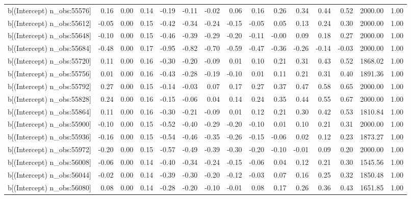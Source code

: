 \begin{table}[ht]
\begin{tabular}{rrrrrrrrrrrrrrr}
  b[(Intercept) n\_obs:55576] & 0.16 & 0.00 & 0.14 & -0.19 & -0.11 & -0.02 & 0.06 & 0.16 & 0.26 & 0.34 & 0.44 & 0.52 & 2000.00 & 1.00 \\ 
  b[(Intercept) n\_obs:55612] & -0.05 & 0.00 & 0.15 & -0.42 & -0.34 & -0.24 & -0.15 & -0.05 & 0.05 & 0.13 & 0.24 & 0.30 & 2000.00 & 1.00 \\ 
  b[(Intercept) n\_obs:55648] & -0.10 & 0.00 & 0.15 & -0.46 & -0.39 & -0.29 & -0.20 & -0.11 & -0.00 & 0.09 & 0.18 & 0.27 & 2000.00 & 1.00 \\ 
  b[(Intercept) n\_obs:55684] & -0.48 & 0.00 & 0.17 & -0.95 & -0.82 & -0.70 & -0.59 & -0.47 & -0.36 & -0.26 & -0.14 & -0.03 & 2000.00 & 1.00 \\ 
  b[(Intercept) n\_obs:55720] & 0.11 & 0.00 & 0.16 & -0.30 & -0.20 & -0.09 & 0.01 & 0.10 & 0.21 & 0.31 & 0.43 & 0.52 & 1868.02 & 1.00 \\ 
  b[(Intercept) n\_obs:55756] & 0.01 & 0.00 & 0.16 & -0.43 & -0.28 & -0.19 & -0.10 & 0.01 & 0.11 & 0.21 & 0.31 & 0.40 & 1891.36 & 1.00 \\ 
  b[(Intercept) n\_obs:55792] & 0.27 & 0.00 & 0.15 & -0.14 & -0.03 & 0.07 & 0.17 & 0.27 & 0.37 & 0.47 & 0.58 & 0.65 & 2000.00 & 1.00 \\ 
  b[(Intercept) n\_obs:55828] & 0.24 & 0.00 & 0.16 & -0.15 & -0.06 & 0.04 & 0.14 & 0.24 & 0.35 & 0.44 & 0.55 & 0.67 & 2000.00 & 1.00 \\ 
  b[(Intercept) n\_obs:55864] & 0.11 & 0.00 & 0.16 & -0.30 & -0.21 & -0.09 & 0.01 & 0.12 & 0.21 & 0.30 & 0.42 & 0.53 & 1810.84 & 1.00 \\ 
  b[(Intercept) n\_obs:55900] & -0.10 & 0.00 & 0.15 & -0.52 & -0.40 & -0.29 & -0.20 & -0.10 & 0.01 & 0.10 & 0.21 & 0.31 & 2000.00 & 1.00 \\ 
  b[(Intercept) n\_obs:55936] & -0.16 & 0.00 & 0.15 & -0.54 & -0.46 & -0.35 & -0.26 & -0.15 & -0.06 & 0.02 & 0.12 & 0.23 & 1873.27 & 1.00 \\ 
  b[(Intercept) n\_obs:55972] & -0.20 & 0.00 & 0.15 & -0.57 & -0.49 & -0.39 & -0.30 & -0.20 & -0.10 & -0.01 & 0.09 & 0.20 & 2000.00 & 1.00 \\ 
  b[(Intercept) n\_obs:56008] & -0.06 & 0.00 & 0.14 & -0.40 & -0.34 & -0.24 & -0.15 & -0.06 & 0.04 & 0.12 & 0.21 & 0.30 & 1545.56 & 1.00 \\ 
  b[(Intercept) n\_obs:56044] & -0.02 & 0.00 & 0.14 & -0.39 & -0.30 & -0.20 & -0.12 & -0.03 & 0.07 & 0.16 & 0.25 & 0.32 & 1850.48 & 1.00 \\ 
  b[(Intercept) n\_obs:56080] & 0.08 & 0.00 & 0.14 & -0.28 & -0.20 & -0.10 & -0.01 & 0.08 & 0.17 & 0.26 & 0.36 & 0.43 & 1651.85 & 1.00 \\ 

\end{tabular}
\end{table}
